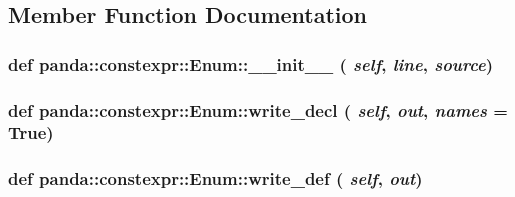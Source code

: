 \subsection{Member Function Documentation}
\hypertarget{classpanda_1_1constexpr_1_1Enum_a129f848f4aaa3a1ff63e4655c242279d}{
\subsubsection[{\_\-\_\-init\_\-\_\-}]{\setlength{\rightskip}{0pt plus 5cm}def panda::constexpr::Enum::\_\-\_\-init\_\-\_\- ( {\em self}, \/   {\em line}, \/   {\em source})}}
\label{classpanda_1_1constexpr_1_1Enum_a129f848f4aaa3a1ff63e4655c242279d}
\hypertarget{classpanda_1_1constexpr_1_1Enum_a0d09200b659f7c2b2373502916623c13}{
\subsubsection[{write\_\-decl}]{\setlength{\rightskip}{0pt plus 5cm}def panda::constexpr::Enum::write\_\-decl ( {\em self}, \/   {\em out}, \/   {\em names} = {\ttfamily True})}}
\label{classpanda_1_1constexpr_1_1Enum_a0d09200b659f7c2b2373502916623c13}
\hypertarget{classpanda_1_1constexpr_1_1Enum_acb10c196f9abf5d6564238ed90d6e8d9}{
\subsubsection[{write\_\-def}]{\setlength{\rightskip}{0pt plus 5cm}def panda::constexpr::Enum::write\_\-def ( {\em self}, \/   {\em out})}}
\label{classpanda_1_1constexpr_1_1Enum_acb10c196f9abf5d6564238ed90d6e8d9}


